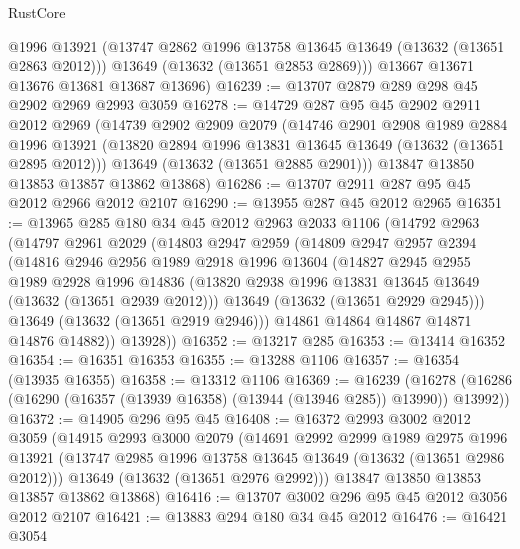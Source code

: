 \begin{lexlean}{RustCore}
\begin{coremodule}
        @1996
        @13921
        (@13747 @2862 @1996 @13758 @13645 @13649 (@13632 (@13651 @2863 @2012)))
        @13649
        (@13632 (@13651 @2853 @2869)))
      @13667
      @13671
      @13676
      @13681
      @13687
      @13696)
@16239 := @13707 @2879 @289 @298 @45 @2902 @2969 @2993 @3059
@16278 := @14729
    @287
    @95
    @45
    @2902
    @2911
    @2012
    @2969
    (@14739
      @2902
      @2909
      @2079
      (@14746
        @2901
        @2908
        @1989
        @2884
        @1996
        @13921
        (@13820 @2894 @1996 @13831 @13645 @13649 (@13632 (@13651 @2895 @2012)))
        @13649
        (@13632 (@13651 @2885 @2901)))
      @13847
      @13850
      @13853
      @13857
      @13862
      @13868)
@16286 := @13707 @2911 @287 @95 @45 @2012 @2966 @2012 @2107
@16290 := @13955 @287 @45 @2012 @2965
@16351 := @13965
    @285
    @180
    @34
    @45
    @2012
    @2963
    @2033
    @1106
    (@14792
      @2963
      (@14797
        @2961
        @2029
        (@14803
          @2947
          @2959
          (@14809
            @2947
            @2957
            @2394
            (@14816
              @2946
              @2956
              @1989
              @2918
              @1996
              @13604
              (@14827
                @2945
                @2955
                @1989
                @2928
                @1996
                @14836
                (@13820 @2938 @1996 @13831 @13645 @13649 (@13632 (@13651 @2939 @2012)))
                @13649
                (@13632 (@13651 @2929 @2945)))
              @13649
              (@13632 (@13651 @2919 @2946)))
            @14861
            @14864
            @14867
            @14871
            @14876
            @14882))
        @13928))
@16352 := @13217 @285
@16353 := @13414 @16352
@16354 := @16351 @16353
@16355 := @13288 @1106
@16357 := @16354 (@13935 @16355)
@16358 := @13312 @1106
@16369 := @16239
    (@16278 (@16286 (@16290 (@16357 (@13939 @16358) (@13944 (@13946 @285)) @13990)) @13992))
@16372 := @14905 @296 @95 @45
@16408 := @16372
    @2993
    @3002
    @2012
    @3059
    (@14915
      @2993
      @3000
      @2079
      (@14691
        @2992
        @2999
        @1989
        @2975
        @1996
        @13921
        (@13747 @2985 @1996 @13758 @13645 @13649 (@13632 (@13651 @2986 @2012)))
        @13649
        (@13632 (@13651 @2976 @2992)))
      @13847
      @13850
      @13853
      @13857
      @13862
      @13868)
@16416 := @13707 @3002 @296 @95 @45 @2012 @3056 @2012 @2107
@16421 := @13883 @294 @180 @34 @45 @2012
@16476 := @16421
    @3054

\end{coremodule}
\end{lexlean}
